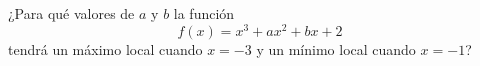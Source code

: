 \item ¿Para qué valores de $a$ y $b$ la función
    $$f(x) = x^3 + ax^2 + bx + 2$$
    tendrá un máximo local cuando $x = -3$ y un mínimo local cuando $x = -1$?
